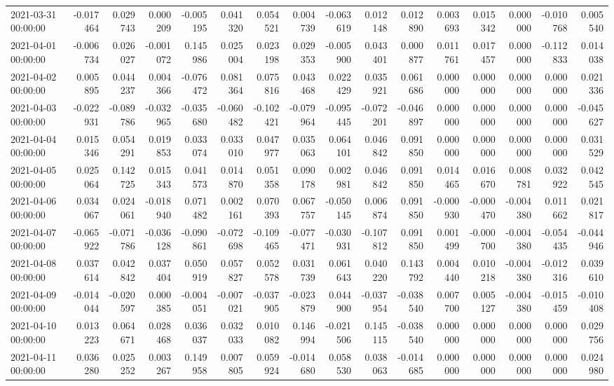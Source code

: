 \begin{tabular}{lrrrrrrrrrrrrrrr}
2021-03-31 00:00:00 & -0.017464 & 0.029743 & 0.000209 & -0.005195 & 0.041320 & 0.054521 & 0.004739 & -0.063619 & 0.012148 & 0.012890 & 0.003693 & 0.015342 & 0.000000 & -0.010768 & 0.005540 \\
2021-04-01 00:00:00 & -0.006734 & 0.026027 & -0.001072 & 0.145986 & 0.025004 & 0.023198 & 0.029353 & -0.005900 & 0.043401 & 0.000877 & 0.011761 & 0.017457 & 0.000000 & -0.112833 & 0.014038 \\
2021-04-02 00:00:00 & 0.005895 & 0.044237 & 0.004366 & -0.076472 & 0.081364 & 0.075816 & 0.043468 & 0.022429 & 0.035921 & 0.061686 & 0.000000 & 0.000000 & 0.000000 & 0.000000 & 0.021336 \\
2021-04-03 00:00:00 & -0.022931 & -0.089786 & -0.032965 & -0.035680 & -0.060482 & -0.102421 & -0.079964 & -0.095445 & -0.072201 & -0.046897 & 0.000000 & 0.000000 & 0.000000 & 0.000000 & -0.045627 \\
2021-04-04 00:00:00 & 0.015346 & 0.054291 & 0.019853 & 0.033074 & 0.033010 & 0.047977 & 0.035063 & 0.064101 & 0.046842 & 0.091850 & 0.000000 & 0.000000 & 0.000000 & 0.000000 & 0.031529 \\
2021-04-05 00:00:00 & 0.025064 & 0.142725 & 0.015343 & 0.041573 & 0.014870 & 0.051358 & 0.090178 & 0.002981 & 0.046842 & 0.091850 & 0.014465 & 0.016670 & 0.008781 & 0.032922 & 0.042545 \\
2021-04-06 00:00:00 & 0.034067 & 0.024061 & -0.018940 & 0.071482 & 0.002161 & 0.070393 & 0.067757 & -0.050145 & 0.006874 & 0.091850 & -0.000930 & -0.000470 & -0.004380 & 0.011662 & 0.021817 \\
2021-04-07 00:00:00 & -0.065922 & -0.071786 & -0.036128 & -0.090861 & -0.072698 & -0.109465 & -0.077471 & -0.030931 & -0.107812 & 0.091850 & 0.001499 & -0.000700 & -0.004380 & -0.054435 & -0.044946 \\
2021-04-08 00:00:00 & 0.037614 & 0.042842 & 0.037404 & 0.050919 & 0.057827 & 0.052578 & 0.031739 & 0.061643 & 0.040220 & 0.143792 & 0.004440 & 0.010218 & -0.004380 & -0.012316 & 0.039610 \\
2021-04-09 00:00:00 & -0.014044 & -0.020597 & 0.000385 & -0.004051 & -0.007021 & -0.037905 & -0.023879 & 0.044900 & -0.037954 & -0.038540 & 0.007700 & 0.005127 & -0.004380 & -0.015459 & -0.010408 \\
2021-04-10 00:00:00 & 0.013223 & 0.064671 & 0.028468 & 0.036037 & 0.032033 & 0.010082 & 0.146994 & -0.021506 & 0.145115 & -0.038540 & 0.000000 & 0.000000 & 0.000000 & 0.000000 & 0.029756 \\
2021-04-11 00:00:00 & 0.036280 & 0.025252 & 0.003267 & 0.149958 & 0.007805 & 0.059924 & -0.014680 & 0.058530 & 0.038063 & -0.014685 & 0.000000 & 0.000000 & 0.000000 & 0.000000 & 0.024980 \\

\end{tabular}
